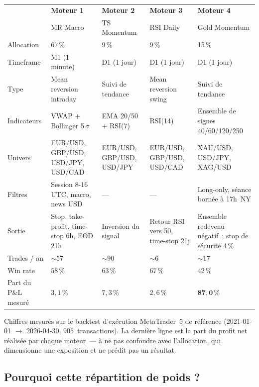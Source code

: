 \documentclass[11pt, a4paper]{scrartcl}
\begin{document}
\begin{center}
\renewcommand{\arraystretch}{1.3}
\setlength{\tabcolsep}{4pt}
\footnotesize
\begin{tabular}{p{2.4cm}p{3.0cm}p{3.0cm}p{3.0cm}p{3.0cm}}
\toprule
 & \cellcolor{softBlue}\textbf{Moteur 1} & \cellcolor{softYellow}\textbf{Moteur 2} & \cellcolor{softGreen}\textbf{Moteur 3} & \cellcolor{lightGrey}\textbf{Moteur 4} \\
 & \cellcolor{softBlue}MR Macro & \cellcolor{softYellow}TS Momentum & \cellcolor{softGreen}RSI Daily & \cellcolor{lightGrey}Gold Momentum \\
\midrule
Allocation & 67\,\% & 9\,\% & 9\,\% & 15\,\% \\
Timeframe & M1 (1 minute) & D1 (1 jour) & D1 (1 jour) & D1 (1 jour) \\
Type & Mean reversion intraday & Suivi de tendance & Mean reversion swing & Suivi de tendance \\
Indicateurs & VWAP + Bollinger 5\,$\sigma$ & EMA 20/50 + RSI(7) & RSI(14) & Ensemble de signes 40/60/120/250 \\
Univers & EUR/USD, GBP/USD, USD/JPY, USD/CAD & EUR/USD, GBP/USD, USD/JPY & EUR/USD, GBP/USD, USD/CAD & XAU/USD, USD/JPY, XAG/USD \\
Filtres & Session 8-16 UTC, macro, news USD & --- & --- & Long-only, séance bornée à 17h~NY \\
Sortie & Stop, take-profit, time-stop 6h, EOD 21h & Inversion du signal & Retour RSI vers 50, time-stop 21j & Ensemble redevenu négatif~; stop de sécurité 4\,\% \\
Trades / an & $\sim 57$ & $\sim 90$ & $\sim 6$ & $\sim 17$ \\
Win rate & $58\,\%$ & $63\,\%$ & $67\,\%$ & $42\,\%$ \\
Part du P\&L mesuré & $3{,}1\,\%$ & $7{,}3\,\%$ & $2{,}6\,\%$ & $\mathbf{87{,}0\,\%}$ \\
\bottomrule
\end{tabular}
\end{center}

\noindent\footnotesize Chiffres mesurés sur le backtest d'exécution MetaTrader~5 de
référence (2021-01-01 $\rightarrow$ 2026-04-30, $905$~transactions). La dernière ligne est
la part du profit net réalisée par chaque moteur~--- à ne pas confondre avec l'allocation,
qui dimensionne une exposition et ne prédit pas un résultat.\normalsize

\subsection{Pourquoi cette répartition de poids ?}
\end{document}
